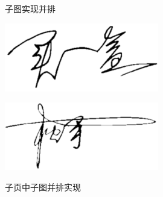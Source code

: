 \documentclass[AutoFakeBold]{ZafuThesis}
\begin{document}
\begin{figure}[htbp]
  \centering
  \hspace{1cm}
  \caption{子图实现并排}  
  \label{figure_子图实现并排}
\end{figure}


\begin{figure}[htbp]
  \centering
  \begin{minipage}[b]{0.45\columnwidth}
    \centering
    \subfloat
    {\includegraphics[width=0.6\textwidth]{figures/MaiYihe}}
  \end{minipage}
  \begin{minipage}[b]{0.45\columnwidth}
    \centering
    \subfloat
    {\includegraphics[width=0.6\textwidth]{figures/SongShou}}      
  \end{minipage}
  \caption{子页中子图并排实现}
  \label{figure_子页中子图并排实现}
\end{figure}
\end{document}
